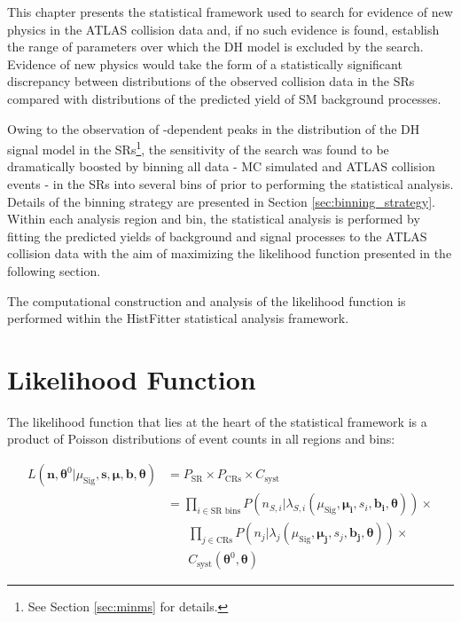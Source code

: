 \label{chapter:stat}

This chapter presents the statistical framework used to search for evidence of new physics in the ATLAS collision data and, if no such evidence is found, establish the range of parameters over which the DH model is excluded by the search. Evidence of new physics would take the form of a statistically significant discrepancy between distributions of the observed collision data in the SRs compared with distributions of the predicted yield of SM background processes.

Owing to the observation of \ms-dependent peaks in the \minms distribution of the DH signal model in the SRs\footnote{See Section \ref{sec:minms} for details.}, the sensitivity of the search was found to be dramatically boosted by binning all data - MC simulated and ATLAS collision events - in the SRs into several bins of \minms prior to performing the statistical analysis. Details of the binning strategy are presented in Section \ref{sec:binning_strategy}. Within each analysis region and bin, the statistical analysis is performed by fitting the predicted yields of background and signal processes to the ATLAS collision data with the aim of maximizing the likelihood function presented in the following section. 

The computational construction and analysis of the likelihood function is performed within the HistFitter \cite{Baak_2015} statistical analysis framework.

\section{Likelihood Function}
\label{sec:likelihood}

The likelihood function that lies at the heart of the statistical framework is a product of Poisson distributions of event counts in all regions and bins:

\begin{equation}
\label{eq:likelihood_func}
\begin{aligned}
L(\boldsymbol{n}, \boldsymbol{\theta}^0|\mu_\text{Sig}, \boldsymbol{s}, \boldsymbol{\mu}, \boldsymbol{b}, \boldsymbol{\theta}) & = P_\text{SR} \times P_\text{CRs} \times C_\text{syst} \\
& = \prod_{i\in\text{SR bins}} P(n_{S,i}|\lambda_{S,i}(\mu_\text{Sig}, \boldsymbol{\mu_i}, s_i, \boldsymbol{b_i}, \boldsymbol{\theta})) \times \\ 
&\phantom{xxx}\prod_{j \in \text{CRs}} P(n_j|\lambda_j(\mu_\text{Sig}, \boldsymbol{\mu_j}, s_j, \boldsymbol{b_j}, \boldsymbol{\theta})) \times \\
&\phantom{xxx}C_\text{syst}(\boldsymbol{\theta}^0, \boldsymbol{\theta})
\end{aligned}
\end{equation}

